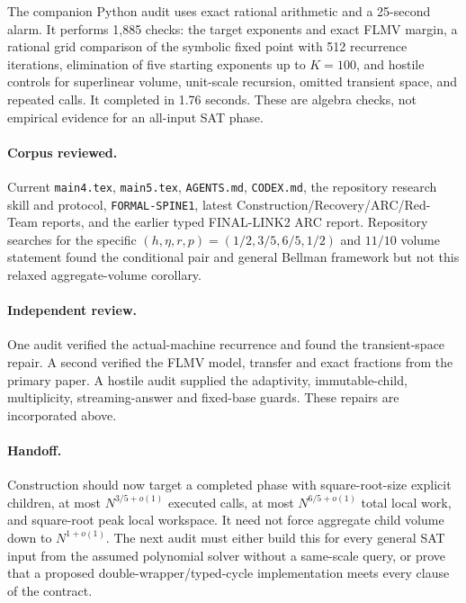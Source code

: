 \documentclass[11pt]{article}
\begin{document}
The companion Python audit uses exact rational arithmetic and a 25-second
alarm.  It performs 1,885 checks: the target exponents and exact FLMV margin,
a rational grid comparison of the symbolic fixed point with 512 recurrence
iterations, elimination of five starting exponents up to $K=100$, and
hostile controls for superlinear volume, unit-scale recursion, omitted
transient space, and repeated calls.  It completed in 1.76 seconds.  These
are algebra checks, not empirical evidence for an all-input SAT phase.

\paragraph{Corpus reviewed.}
Current \texttt{main4.tex}, \texttt{main5.tex}, \texttt{AGENTS.md},
\texttt{CODEX.md}, the repository research skill and protocol,
\texttt{FORMAL-SPINE1}, latest Construction/Recovery/ARC/Red-Team reports,
and the earlier typed FINAL-LINK2 ARC report.  Repository searches for the
specific $(h,\eta,r,p)=(1/2,3/5,6/5,1/2)$ and $11/10$ volume statement found
the conditional pair and general Bellman framework but not this relaxed
aggregate-volume corollary.

\paragraph{Independent review.}
One audit verified the actual-machine recurrence and found the transient-space
repair.  A second verified the FLMV model, transfer and exact fractions from
the primary paper.  A hostile audit supplied the adaptivity, immutable-child,
multiplicity, streaming-answer and fixed-base guards.  These repairs are
incorporated above.

\paragraph{Handoff.}
Construction should now target a completed phase with square-root-size
explicit children, at most $N^{3/5+o(1)}$ executed calls, at most
$N^{6/5+o(1)}$ total local work, and square-root peak local workspace.  It
need not force aggregate child volume down to $N^{1+o(1)}$.  The next audit
must either build this for every general SAT input from the assumed
polynomial solver without a same-scale query, or prove that a proposed
double-wrapper/typed-cycle implementation meets every clause of the contract.

\end{document}
